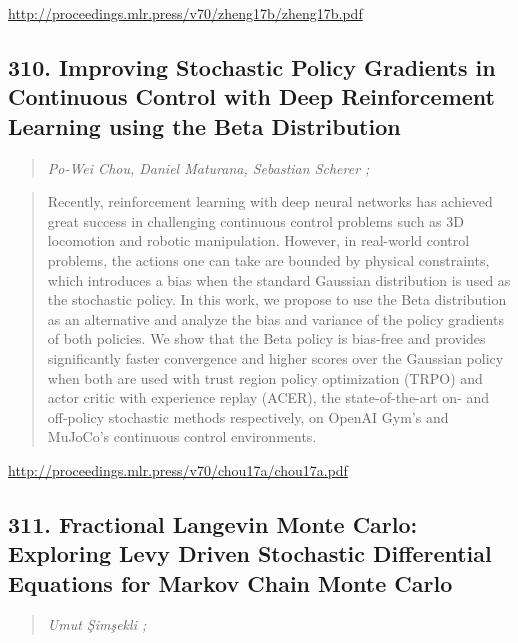 \documentclass{article}
\begin{document}
\href{http://proceedings.mlr.press/v70/zheng17b/zheng17b.pdf}{http://proceedings.mlr.press/v70/zheng17b/zheng17b.pdf}

\subsection{310. Improving Stochastic Policy Gradients in Continuous Control with Deep Reinforcement Learning using the Beta Distribution}

\begin{quote}
\footnotesize{\textit{Po-Wei Chou, Daniel Maturana, Sebastian Scherer ;}}
\end{quote}

\begin{quote}
    Recently, reinforcement learning with deep neural networks has achieved great success in challenging continuous control problems such as 3D locomotion and robotic manipulation. However, in real-world control problems, the actions one can take are bounded by physical constraints, which introduces a bias when the standard Gaussian distribution is used as the stochastic policy. In this work, we propose to use the Beta distribution as an alternative and analyze the bias and variance of the policy gradients of both policies. We show that the Beta policy is bias-free and provides significantly faster convergence and higher scores over the Gaussian policy when both are used with trust region policy optimization (TRPO) and actor critic with experience replay (ACER), the state-of-the-art on- and off-policy stochastic methods respectively, on OpenAI Gym’s and MuJoCo’s continuous control environments.  \end{quote}

\href{http://proceedings.mlr.press/v70/chou17a/chou17a.pdf}{http://proceedings.mlr.press/v70/chou17a/chou17a.pdf}

\subsection{311. Fractional Langevin Monte Carlo: Exploring Levy Driven Stochastic Differential Equations for Markov Chain Monte Carlo}

\begin{quote}
\footnotesize{\textit{Umut Şimşekli ;}}
\end{quote}
\end{document}
